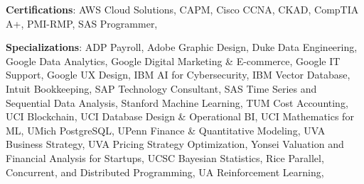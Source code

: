 \begin{highlights}
\item \textbf{Certifications}: AWS Cloud Solutions, CAPM, Cisco CCNA, CKAD, CompTIA A+, PMI-RMP, SAS Programmer, 
\item \textbf{Specializations}: ADP Payroll, Adobe Graphic Design, Duke Data Engineering, Google Data Analytics, Google Digital Marketing \& E-commerce, Google IT Support, Google UX Design, IBM AI for Cybersecurity, IBM Vector Database, Intuit Bookkeeping, SAP Technology Consultant, SAS Time Series and Sequential Data Analysis, Stanford Machine Learning, TUM Cost Accounting, UCI Blockchain, UCI Database Design \& Operational BI, UCI Mathematics for ML, UMich PostgreSQL, UPenn Finance \& Quantitative Modeling, UVA Business Strategy, UVA Pricing Strategy Optimization, Yonsei Valuation and Financial Analysis for Startups, UCSC Bayesian Statistics, Rice Parallel, Concurrent, and Distributed Programming, UA Reinforcement Learning, 
\end{highlights}